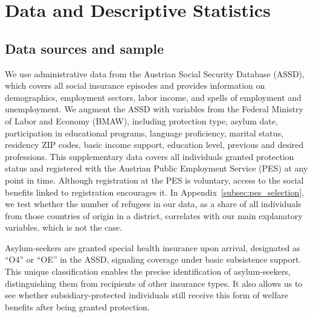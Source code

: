 
\section{Data and Descriptive Statistics} \label{sec:dataoob}

\subsection{Data sources and sample} 
We use administrative data from the Austrian Social Security Database (ASSD), which covers all social insurance episodes and provides information on demographics, employment sectors, labor income, and spells of employment and unemployment. We augment the ASSD with variables from the Federal Ministry of Labor and Economy (BMAW), including protection type, asylum date, participation in educational programs, language proficiency, marital status, residency ZIP codes, basic income support, education level, previous and desired professions. This supplementary data covers all individuals granted protection status and registered with the Austrian Public Employment Service (PES) at any point in time. Although registration at the PES is voluntary, access to the social benefits linked to registration encourages it. In Appendix~\ref{subsec:pes_selection}, we test whether the number of refugees in our data, as a share of all individuals from those countries of origin in a district, correlates with our main explanatory variables, which is not the case.  %

Asylum-seekers are granted special health insurance upon arrival, designated as ``O4'' or ``OE'' in the ASSD, signaling coverage under basic subsistence support. This unique classification enables the precise identification of asylum-seekers, distinguishing them from recipients of other insurance types. It also allows us to see whether subsidiary-protected individuals still receive this form of welfare benefits after being granted protection.

